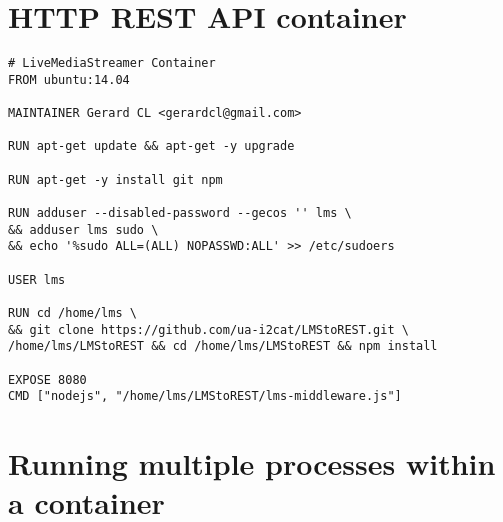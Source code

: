 \section{HTTP REST API container}\label{ANX:dockerFiles2}

\begin{verbatim}
# LiveMediaStreamer Container
FROM ubuntu:14.04

MAINTAINER Gerard CL <gerardcl@gmail.com>

RUN apt-get update && apt-get -y upgrade

RUN apt-get -y install git npm

RUN adduser --disabled-password --gecos '' lms \
&& adduser lms sudo \
&& echo '%sudo ALL=(ALL) NOPASSWD:ALL' >> /etc/sudoers

USER lms

RUN cd /home/lms \
&& git clone https://github.com/ua-i2cat/LMStoREST.git \
/home/lms/LMStoREST && cd /home/lms/LMStoREST && npm install

EXPOSE 8080
CMD ["nodejs", "/home/lms/LMStoREST/lms-middleware.js"]
\end{verbatim}

\section{Running multiple processes within a container}\label{ANX:dockerFiles3}

